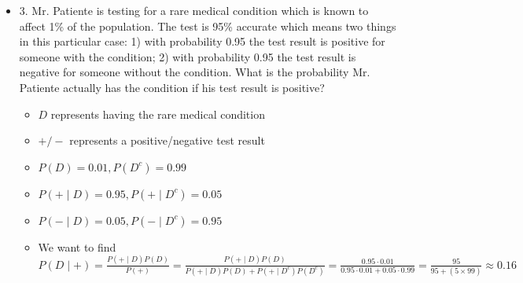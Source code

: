 \documentclass{article}
\newcommand{\indep}{\perp\!\!\!\perp}
\begin{document}
\begin{itemize}
\begin{itemize}
\begin{itemize}
            \item Thus $A \indep B^c$
        \end{itemize}
        \item (b) $A^c$ and $B$
        \begin{itemize}
            \item The proof of $A^c \indep B$ is obtained as the proof of $A \indep B^c$ given in part (a) with the notation for $A$ and $B$ interchanged
        \end{itemize}
        \item (c) $A^c$ and $B^c$
        \begin{itemize}
            \item $P(A^c \cap B^c) = P((A \cup B)^c)$ by De Morgan's Law
            \item $= 1- P(A \cup B)$ by "Property 1"
            \item $= 1 - P(A) - P(B) + P(A \cap B)$ by "Property 4"
            \item $= 1 - P(A) - P(B) + P(A)P(B)$ since $A \indep B$
            \item $= [1 - P(A)][1 - P(B)]$
            \item $= P(A^c)P(B^c)$ by "Property 1"
            \item Thus $A^c \indep B^c$
        \end{itemize}
    \end{itemize}
    \item 3. Mr. Patiente is testing for a rare medical condition which is known to affect 1\% of the population. The test is 95\% accurate which means two things in this particular case: 1) with probability 0.95 the test result is positive for someone with the condition; 2) with probability 0.95 the test result is negative for someone without the condition. What is the probability Mr. Patiente actually has the condition if his test result is positive?
    \begin{itemize}
        \item $D$ represents having the rare medical condition
        \item $+/-$ represents a positive/negative test result
        \item $P(D) = 0.01, P(D^c) = 0.99$
        \item $P(+ \mid D) = 0.95, P(+ \mid D^c) = 0.05$
        \item $P(- \mid D) = 0.05, P(- \mid D^c) = 0.95$
        \item We want to find $P(D \mid +) = \frac{P(+ \mid D) P(D)}{P(+)} = \frac{P(+ \mid D) P(D)}{P(+ \mid D)P(D) + P(+ \mid D^c)P(D^c)} = \frac{0.95 \cdot 0.01}{0.95 \cdot 0.01 + 0.05 \cdot 0.99} = \frac{95}{95 + (5 \times 99)} \approx 0.16$

\end{itemize}
\end{itemize}
\end{document}
